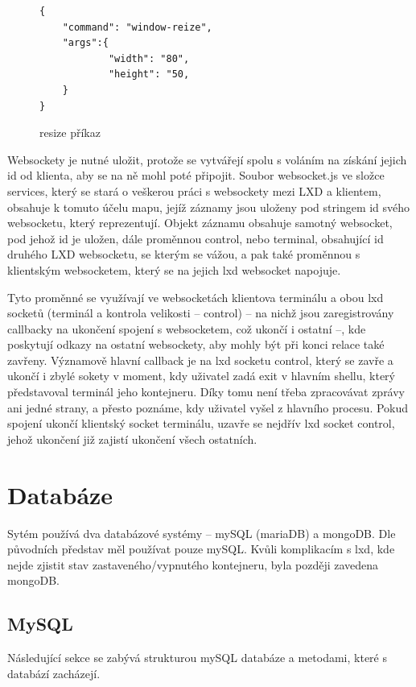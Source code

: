 \documentclass[a4paper,oneside,12pt]{report}
\begin{document}
\begin{figure}[h]
\centering
\begin{lstlisting}[tabsize=3]
{
	"command": "window-reize",
	"args":{
			"width": "80",
			"height": "50,
	}
}
\end{lstlisting}
\caption{resize příkaz}
\label{fig:resize}
\end{figure}


Websockety je nutné uložit, protože se vytvářejí spolu s voláním na získání jejich id od klienta, aby se na ně mohl poté připojit. Soubor websocket.js ve složce services, který se stará o veškerou práci s websockety mezi LXD a klientem, obsahuje k tomuto účelu mapu, jejíž záznamy jsou uloženy pod stringem id svého websocketu, který reprezentují. Objekt záznamu obsahuje samotný websocket, pod jehož id je uložen, dále proměnnou control, nebo terminal, obsahující id druhého LXD websocketu, se kterým se vážou, a pak také proměnnou s klientským websocketem, který se na jejich lxd websocket napojuje.

Tyto proměnné se využívají ve websocketách klientova terminálu a obou lxd socketů (terminál a kontrola velikosti – control) – na nichž jsou zaregistrovány callbacky na ukončení spojení s websocketem, což ukončí i ostatní –, kde poskytují odkazy na ostatní websockety, aby mohly být při konci relace také zavřeny. Významově hlavní callback je na lxd socketu control, který se zavře a ukončí i zbylé sokety v moment, kdy uživatel zadá exit v hlavním shellu, který představoval terminál jeho kontejneru. Díky tomu není třeba zpracovávat zprávy ani jedné strany, a přesto poznáme, kdy uživatel vyšel z hlavního procesu. Pokud spojení ukončí klientský socket terminálu, uzavře se nejdřív lxd socket control, jehož ukončení již zajistí ukončení všech ostatních.



\section{Databáze}

Sytém používá dva databázové systémy -- mySQL (mariaDB) a mongoDB.
Dle původních představ měl používat pouze mySQL.
Kvůli komplikacím s lxd, kde nejde zjistit stav zastaveného/vypnutého kontejneru, byla později zavedena mongoDB.

\subsection{MySQL}
Následující sekce se zabývá strukturou mySQL databáze a metodami, které s databází zacházejí.
\end{document}
